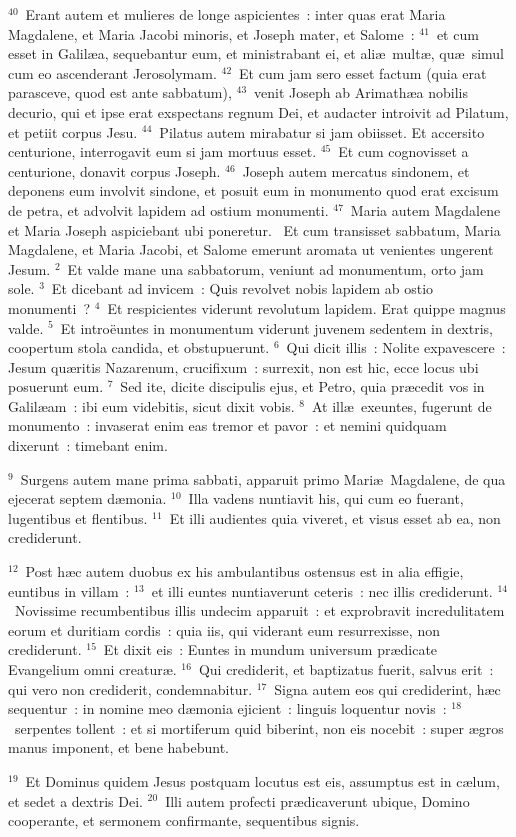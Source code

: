 ${}^{40}$~Erant autem et mulieres de longe aspicientes~: inter quas erat Maria Magdalene, et Maria Jacobi minoris, et Joseph mater, et Salome~:
${}^{41}$~et cum esset in Galil\ae a, sequebantur eum, et ministrabant ei, et ali\ae\ mult\ae , qu\ae\ simul cum eo ascenderant Jerosolymam.
${}^{42}$~Et cum jam sero esset factum (quia erat parasceve, quod est ante sabbatum),
${}^{43}$~venit Joseph ab Arimath\ae a nobilis decurio, qui et ipse erat exspectans regnum Dei, et audacter introivit ad Pilatum, et petiit corpus Jesu.
${}^{44}$~Pilatus autem mirabatur si jam obiisset. Et accersito centurione, interrogavit eum si jam mortuus esset.
${}^{45}$~Et cum cognovisset a centurione, donavit corpus Joseph.
${}^{46}$~Joseph autem mercatus sindonem, et deponens eum involvit sindone, et posuit eum in monumento quod erat excisum de petra, et advolvit lapidem ad ostium monumenti.
${}^{47}$~Maria autem Magdalene et Maria Joseph aspiciebant ubi poneretur.
~Et cum transisset sabbatum, Maria Magdalene, et Maria Jacobi, et Salome emerunt aromata ut venientes ungerent Jesum.
${}^{2}$~Et valde mane una sabbatorum, veniunt ad monumentum, orto jam sole.
${}^{3}$~Et dicebant ad invicem~: Quis revolvet nobis lapidem ab ostio monumenti~?
${}^{4}$~Et respicientes viderunt revolutum lapidem. Erat quippe magnus valde.
${}^{5}$~Et intro\"euntes in monumentum viderunt juvenem sedentem in dextris, coopertum stola candida, et obstupuerunt.
${}^{6}$~Qui dicit illis~: Nolite expavescere~: Jesum qu\ae ritis Nazarenum, crucifixum~: surrexit, non est hic, ecce locus ubi posuerunt eum.
${}^{7}$~Sed ite, dicite discipulis ejus, et Petro, quia pr\ae cedit vos in Galil\ae am~: ibi eum videbitis, sicut dixit vobis.
${}^{8}$~At ill\ae\ exeuntes, fugerunt de monumento~: invaserat enim eas tremor et pavor~: et nemini quidquam dixerunt~: timebant enim.


${}^{9}$~Surgens autem mane prima sabbati, apparuit primo Mari\ae\ Magdalene, de qua ejecerat septem d\ae monia.
${}^{10}$~Illa vadens nuntiavit his, qui cum eo fuerant, lugentibus et flentibus.
${}^{11}$~Et illi audientes quia viveret, et visus esset ab ea, non crediderunt.


${}^{12}$~Post h\ae c autem duobus ex his ambulantibus ostensus est in alia effigie, euntibus in villam~:
${}^{13}$~et illi euntes nuntiaverunt ceteris~: nec illis crediderunt.
${}^{14}$~Novissime recumbentibus illis undecim apparuit~: et exprobravit incredulitatem eorum et duritiam cordis~: quia iis, qui viderant eum resurrexisse, non crediderunt.
${}^{15}$~Et dixit eis~: Euntes in mundum universum pr\ae dicate Evangelium omni creatur\ae .
${}^{16}$~Qui crediderit, et baptizatus fuerit, salvus erit~: qui vero non crediderit, condemnabitur.
${}^{17}$~Signa autem eos qui crediderint, h\ae c sequentur~: in nomine meo d\ae monia ejicient~: linguis loquentur novis~:
${}^{18}$~serpentes tollent~: et si mortiferum quid biberint, non eis nocebit~: super \ae gros manus imponent, et bene habebunt.


${}^{19}$~Et Dominus quidem Jesus postquam locutus est eis, assumptus est in c\ae lum, et sedet a dextris Dei.
${}^{20}$~Illi autem profecti pr\ae dicaverunt ubique, Domino cooperante, et sermonem confirmante, sequentibus signis.
